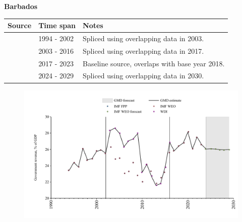 \documentclass[12pt,a4paper,landscape]{article}
\begin{document}
\begin{adjustbox}{max totalsize={\paperwidth}{\paperheight},center}
\begin{minipage}[t][\textheight][t]{\textwidth}
\vspace*{0.5cm}
{}
\begin{center}
{\Large\bfseries Barbados}
\end{center}
\vspace{0.5cm}
\begin{table}[H]
\centering
\small
\begin{tabular}{|l|l|l|}
\hline
\textbf{Source} & \textbf{Time span} & \textbf{Notes} \\
\hline
\rowcolor{white}\cite{IMF_WEO}& 1994 - 2002 &Spliced using overlapping data in 2003.\\
\rowcolor{lightgray}\cite{WDI}& 2003 - 2016 &Spliced using overlapping data in 2017.\\
\rowcolor{white}\cite{IMF_WEO}& 2017 - 2023 &Baseline source, overlaps with base year 2018.\\
\rowcolor{lightgray}\cite{IMF_WEO_forecast}& 2024 - 2029 &Spliced using overlapping data in 2030.\\
\hline
\end{tabular}
\end{table}
\begin{figure}[H]
\centering
\includegraphics[width=\textwidth,height=0.6\textheight,keepaspectratio]{graphs/BRB_govrev_GDP.pdf}
\end{figure}
\end{minipage}
\end{adjustbox}
\end{document}
